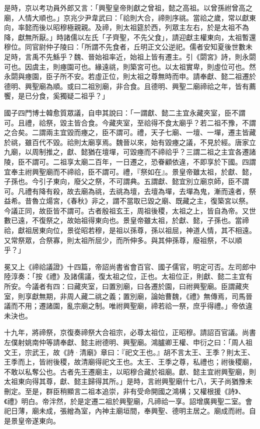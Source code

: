 \begin{pinyinscope}
 是時，京以考功員外郎又言：「興聖皇帝則獻之曾祖，懿之高祖。以曾孫祔曾高之廟，人情大順也。」京兆少尹韋武曰：「祫則大合，禘則序祧。當祫之歲，常以獻東向，率懿而後以昭穆極親親。及禘，則太祖筵於西，列眾主左右，於是太祖不為降，獻無所厭。」時諸儒以左氏「子齊聖，不先父食」，請迎獻主權東向，太祖暫還穆位。同官尉仲子陵曰：「所謂不先食者，丘明正文公逆祀。儒者安知夏後世數未足時，言禹不先鯀乎？魏、晉始祖率近，始祖上皆有遷主。引《閟宮》詩，則永閟可也。因虞主，則瘞園可也。緣遠祧，則築宮可也。以太祖實卑，則虛位可也。然永閟與瘞園，臣子所不安。若虛正位，則太祖之尊無時而申。請奉獻、懿二祖遷於德明、興聖廟為順。或曰二祖別廟，非合食。且德明、興聖二廟禘祫之年，皆有薦饗，是已分食，奚獨疑二祖乎？」



 國子四門博士韓愈質眾議，自申其說曰：「一謂獻、懿二主宜永藏夾室，臣不謂可。且禮，祫祭，毀主皆合食。今藏夾室，至祫得不食太廟乎？若二祖不豫，不謂之合矣。二謂兩主宜毀而瘞之，臣不謂可。禮，天子七廟、一壇、一墠，遷主皆藏於祧，雖百代不毀。祫則太廟享焉。魏晉以來，始有毀瘞之議，不見於經。唐家立九廟，以周制推之，獻、懿猶在壇墠，可毀瘞而不禘祫乎？三謂二祖之主宜各遷諸陵，臣不謂可。二祖享太廟二百年，一日遷之，恐眷顧依違，不即享於下國。四謂宜奉主祔興聖廟而不禘祫，臣不謂可。禮，『祭如在』。景皇帝雖太祖，於獻、懿，子孫也。今引子東向，廢父之祭，不可謂典。五謂獻、懿宜別立廟京師，臣不謂可。凡禮有降有殺，故去廟為祧，去祧為壇，去壇為墠，去墠為鬼，漸而遠者，祭益希。昔魯立煬宮，《春秋》非之，謂不當取已毀之廟、既藏之主，復築宮以祭。今議正同，故臣皆不謂可。古者殷祖玄王，周祖後稷，太祖之上，皆自為帝。又世數已遠，不復祭之，故始祖得東向也。景皇帝雖太祖，於獻、懿，子孫也。當禘祫，獻祖居東向位，景從昭若穆，是祖以孫尊，孫以祖屈，神道人情，其不相遠。又常祭眾，合祭寡，則太祖所屈少，而所伸多。與其伸孫尊，廢祖祭，不以順乎？」



 冕又上《禘祫議證》十四篇，帝詔尚書省會百官、國子儒官，明定可否。左司郎中陸淳奏：「按《禮》及諸儒議，復太祖之位，正也。太祖位正，則獻、懿二主宜有所安。今議者有四：曰藏夾室，曰置別廟，曰各遷於園，曰祔興聖廟。臣謂藏夾室，則享獻無期，非周人藏二祧之義；置別廟，論始曹魏，《禮》無傳焉，司馬晉議而不用；遷諸園，亂宗廟之制。唯祔興聖廟，禘若祫一祭，庶乎得禮。」帝依違未決也。



 十九年，將禘祭，京復奏禘祭大合祖宗，必尊太祖位，正昭穆。請詔百官議。尚書左僕射姚南仲等請奉獻、懿主祔德明、興聖廟。鴻臚卿王權、申衍之曰：「周人祖文王，宗武王，故《詩·清廟》章曰：『祀文王也。』胡不言太王、王季？則太王、王季而上，皆祔後稷，故清廟得祀文王也。太王、王季之尊，私禮也；祔後稷廟，不敢以私奪公也。古者先王遷廟主，以昭穆合藏於祖廟。獻、懿主宜祔興聖廟，則太祖東向得其尊，獻、懿主歸得其所。」是時，言祔興聖廟什七八，天子尚猶豫未刪定。至是，群臣稍顯言二祖本追崇，非有受命開國之鴻構；又權根援《詩》、《禮》明白。帝泮然，於是定遷二祖於興聖廟，凡禘祫一享。詔增廣興聖二室。會祀日薄，廟未成，張繒為室，內神主廟垣間，奉興聖、德明主居之。廟成而祔。自是景皇帝遂東向。




\end{pinyinscope}
